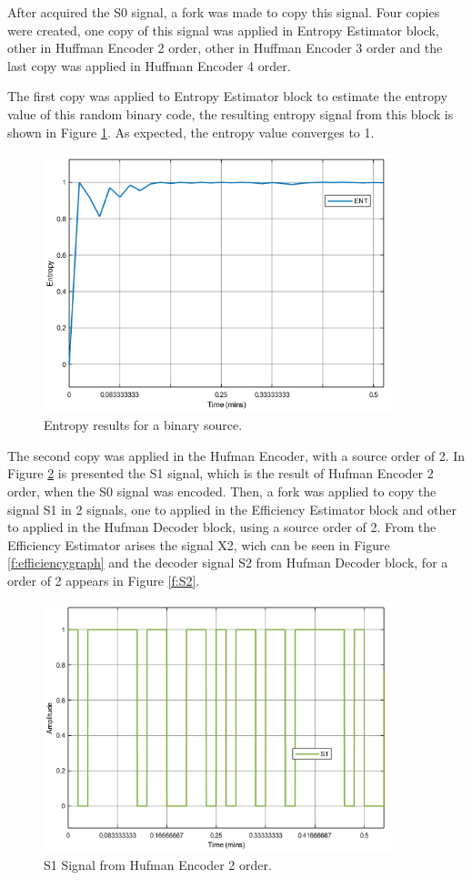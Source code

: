 \begin{refsection}
After acquired the S0 signal, a fork was made to copy this signal. Four copies were created, one copy of this signal was applied in Entropy Estimator block, other in Huffman Encoder 2 order,  other in Huffman Encoder 3 order and the last copy was applied in Huffman Encoder 4 order.

The first copy was applied to Entropy Estimator block to estimate the entropy value of this random binary code, the resulting entropy signal from this block is shown in Figure \ref{f:entropy}. As expected, the entropy value converges to 1.
\begin{figure}[!h]
\centering
\includegraphics[width=4in]{./sdf/eit_45550_estimator_source_code_efficiency/figures/entropy.png}
\caption[Entropy results for aa binary source.]{Entropy results for a binary source.}
\label{f:entropy}
\end{figure}

The second copy was applied in the Hufman Encoder, with a source order of 2. In Figure \ref{f:S1} is presented the S1 signal, which is the result of Hufman Encoder 2 order, when the S0 signal was encoded.
Then, a fork was applied to copy the signal S1 in 2 signals, one to applied in the Efficiency Estimator block and other to applied in the Hufman Decoder block, using a source order of 2.
From the Efficiency Estimator arises the signal X2, wich can be seen in Figure \ref{f:efficiencygraph} and the decoder signal S2 from Hufman Decoder block, for a order of 2 appears in Figure \ref{f:S2}. 
\begin{figure}[!h]
\centering
\includegraphics[width=4in]{./sdf/eit_45550_estimator_source_code_efficiency/figures/S1.png}
\caption[S1 Signal from Hufman Encoder 2 order.]{S1 Signal from Hufman Encoder 2 order.}
\label{f:S1}
\end{figure}



\end{refsection}
